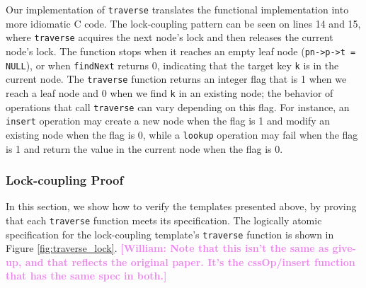 \documentclass[a4paper,UKenglish,cleveref, autoref, thm-restate]{lipics-v2021}
\newcommand{\than}[1]{\textbf{\textcolor{blue}{[Than: #1]}}}
\newcommand{\wm}[1]{\textbf{\textcolor{violet}{[William: #1]}}}
\begin{document}
Our implementation of \lstinline{traverse} translates the functional implementation into more idiomatic C code. The lock-coupling pattern can be seen on lines 14 and 15, where \lstinline{traverse} acquires the next node's lock and then releases the current node's lock. The function stops when it reaches an empty leaf node (\lstinline{pn->p->t = NULL}), or when \lstinline{findNext} returns 0, indicating that the target key \lstinline{k} is in the current node. The \lstinline{traverse} function returns an integer flag that is 1 when we reach a leaf node and 0 when we find \lstinline{k} in an existing node; the behavior of operations that call \lstinline{traverse} can vary depending on this flag. For instance, an \lstinline{insert} operation may create a new node when the flag is 1 and modify an existing node when the flag is 0, while a \lstinline{lookup} operation may fail when the flag is 1 and return the value in the current node when the flag is 0.


\subsubsection{Lock-coupling Proof}
\label{traverse_proof_lock}
In this section, we show how to verify the templates presented above, by proving that each \lstinline{traverse} function meets its specification. The logically atomic specification for the lock-coupling template's \lstinline{traverse} function is shown in Figure \ref{fig:traverse_lock}. \wm{Note that this isn't the same as give-up, and that reflects the original paper. It's the cssOp/insert function that has the same spec in both.}
\end{document}
